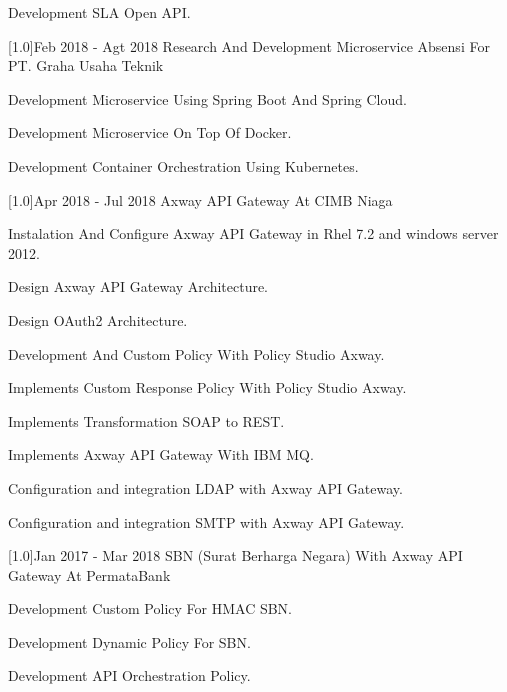 \documentclass[english]{cv-style}
\begin{document}
\begin{entrylist}
{\begin{itemize}
{    \item Development SLA Open API.}
  \end{itemize}}
\entry
{\scalebox{.6}[1.0]{Feb 2018 - Agt 2018}}
{Research And Development Microservice Absensi For PT. Graha Usaha Teknik}
{}
{\vspace{-0.3cm}
  \begin{itemize}\small{
    \item Development Microservice Using Spring Boot And Spring Cloud.
    \item Development Microservice On Top Of Docker.
    \item Development Container Orchestration Using Kubernetes.}
  \end{itemize}}
\entry
{\scalebox{.6}[1.0]{Apr 2018 - Jul 2018}}
{Axway API Gateway At CIMB Niaga}
{}
{\vspace{-0.3cm}
  \begin{itemize}\small{
    \item Instalation And Configure Axway API Gateway in Rhel 7.2 and windows server 2012.
    \item Design Axway API Gateway Architecture.
    \item Design OAuth2 Architecture.
    \item Development And Custom Policy With Policy Studio Axway.
    \item Implements Custom Response Policy With Policy Studio Axway.
    \item Implements Transformation SOAP to REST.
    \item Implements Axway API Gateway With IBM MQ.
    \item Configuration and integration LDAP with Axway API Gateway.
    \item Configuration and integration SMTP with Axway API Gateway.}
  \end{itemize}}
\entry
{\scalebox{.6}[1.0]{Jan 2017 - Mar 2018}}
{SBN (Surat Berharga Negara) With Axway API Gateway At PermataBank}
{}
{\vspace{-0.3cm}
  \begin{itemize}\small{
    \item Development Custom Policy For HMAC SBN.
    \item Development Dynamic Policy For SBN.
    \item Development API Orchestration Policy.}
  \end{itemize}}

\end{entrylist}
\end{document}
